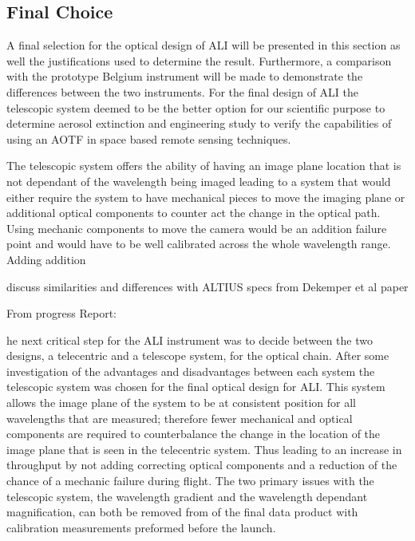 \subsection{Final Choice}

A final selection for the optical design of ALI will be presented in this section as well the justifications used to determine the result. Furthermore, a comparison with the prototype Belgium instrument will be made to demonstrate the differences between the two instruments. For the final design of ALI the telescopic system deemed to be the better option for our scientific purpose to determine aerosol extinction and engineering study to verify the capabilities of using an AOTF in space based remote sensing techniques.

The telescopic system offers the ability of having an image plane location that is not dependant of the wavelength being imaged leading to a system that would either require the system to have mechanical pieces to move the imaging plane or additional optical components to counter act the change in the optical path. Using mechanic components to move the camera would be an addition failure point and would have to be well calibrated across the whole wavelength range. Adding addition

discuss similarities and differences with ALTIUS specs from Dekemper et al paper



From progress Report:

he next critical step for the ALI instrument was to decide between the two designs, a telecentric and a telescope system, for the optical chain. After some investigation of the advantages and disadvantages between each system the telescopic system was chosen for the final optical design for ALI. This system allows the image plane of the system to be at consistent position for all wavelengths that are measured; therefore fewer mechanical and optical components are required to counterbalance the change in the location of the image plane that is seen in the telecentric system. Thus leading to an increase in throughput by not adding correcting optical components and a reduction of the chance of a mechanic failure during flight. The two primary issues with the telescopic system, the wavelength gradient and the wavelength dependant magnification, can both be removed from of the final data product with calibration measurements preformed before the launch.

